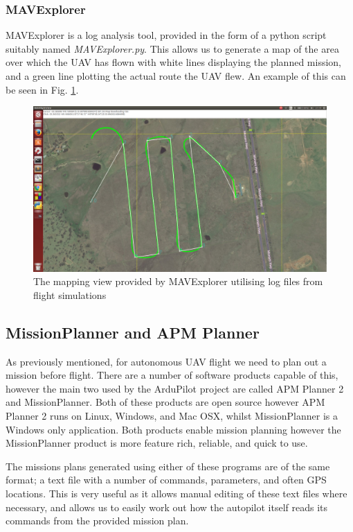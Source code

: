 \subsubsection{MAVExplorer}
\label{intro:mavexplorer}
MAVExplorer is a log analysis tool, provided in the form of a python script suitably named \textit{MAVExplorer.py}. This allows us to generate a map of the area over which the UAV has flown with white lines displaying the planned mission, and a green line plotting the actual route the UAV flew. An example of this can be seen in Fig. \ref{fig:mavexplorer}.

\begin{figure}[htbp!] 
\centering    
\includegraphics[width=\textwidth]{MAVExplorer}
\caption[MAVExplorer Example]{The mapping view provided by MAVExplorer utilising log files from flight simulations}
\label{fig:mavexplorer}
\end{figure}

\subsection{MissionPlanner and APM Planner}
\label{intro:planner}

As previously mentioned, for autonomous UAV flight we need to plan out a mission before flight. There are a number of software products capable of this, however the main two used by the ArduPilot project are called APM Planner 2 and MissionPlanner. Both of these products are open source however APM Planner 2 runs on Linux, Windows, and Mac OSX, whilst MissionPlanner is a Windows only application. Both products enable mission planning however the MissionPlanner product is more feature rich, reliable, and quick to use. 

The missions plans generated using either of these programs are of the same format; a text file with a number of commands, parameters, and often GPS locations. This is very useful as it allows manual editing of these text files where necessary, and allows us to easily work out how the autopilot itself reads its commands from the provided mission plan. 

